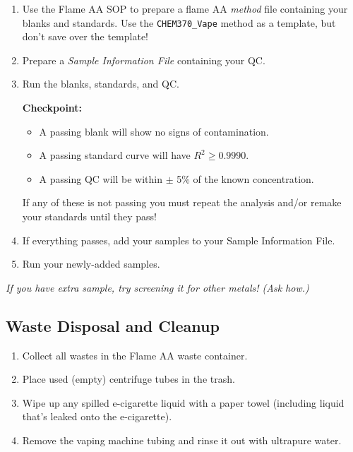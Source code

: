 \documentclass[]{tufte-book}
\providecommand{\tightlist}{%
  \setlength{\itemsep}{0pt}\setlength{\parskip}{0pt}}
\begin{document}
\begin{enumerate}
\def\labelenumi{\arabic{enumi}.}
\item
  Use the Flame AA SOP to prepare a flame AA \emph{method} file containing your blanks and standards. Use the \texttt{CHEM370\_Vape} method as a template, but don't save over the template!
\item
  Prepare a \emph{Sample Information File} containing your QC.
\item
  Run the blanks, standards, and QC.

  \begin{marginfigure}
   \textbf{Checkpoint:}

   \begin{itemize}
   \tightlist
   \item
     A passing blank will show no signs of contamination.\\
   \item
     A passing standard curve will have \(R^2 \ge 0.9990\).\\
   \item
     A passing QC will be within \(\pm\) 5\% of the known concentration.
   \end{itemize}

   If any of these is not passing you must repeat the analysis and/or
   remake your standards until they pass!
   \end{marginfigure}
\item
  If everything passes, add your samples to your Sample Information File.
\item
  Run your newly-added samples.
\end{enumerate}

\emph{If you have extra sample, try screening it for other metals! (Ask how.)}

\hypertarget{waste-disposal-and-cleanup}{%
\subsection{Waste Disposal and Cleanup}\label{waste-disposal-and-cleanup}}

\begin{enumerate}
\def\labelenumi{\arabic{enumi}.}
\tightlist
\item
  Collect all wastes in the Flame AA waste container.
\item
  Place used (empty) centrifuge tubes in the trash.
\item
  Wipe up any spilled e-cigarette liquid with a paper towel (including liquid that's leaked onto the e-cigarette).
\item
  Remove the vaping machine tubing and rinse it out with ultrapure water.
\end{enumerate}
\end{document}

